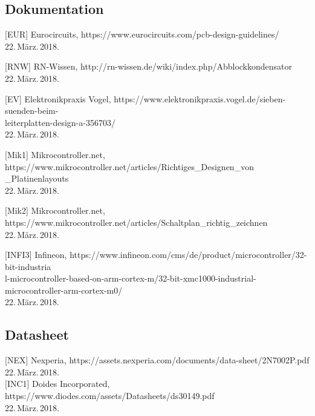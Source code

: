 \subsection{Dokumentation}

{ {[EUR] {Eurocircuits}}, {https://www.eurocircuits.com/pcb-design-guidelines/ }
\\ {22.\,März.\,2018}.\\

{ {[RNW] {RN-Wissen}}, {http://rn-wissen.de/wiki/index.php/Abblockkondensator }
\\ {22.\,März.\,2018}.\\

{ {[EV] {Elektronikpraxis Vogel}}, {https://www.elektronikpraxis.vogel.de/sieben-suenden-beim-\\leiterplatten-design-a-356703/ }
\\ {22.\,März.\,2018}.\\

{ {[Mik1] {Mikrocontroller.net}}, { https://www.mikrocontroller.net/articles/Richtiges\_Designen\_von\\
\_Platinenlayouts }
\\ {22.\,März.\,2018}.\\

{ {[Mik2] {Mikrocontroller.net}}, {https://www.mikrocontroller.net/articles/Schaltplan\_richtig\_zeichnen }
\\ {22.\,März.\,2018}.\\

{ {[INFI3] {Infineon}}, {https://www.infineon.com/cms/de/product/microcontroller/32-bit-industria\\
l-microcontroller-based-on-arm-cortex-m/32-bit-xmc1000-industrial-microcontroller-arm-cortex-m0/   }
\\ {22.\,März.\,2018}.\\

\subsection{Datasheet}

{ {[NEX] {Nexperia}}, {https://assets.nexperia.com/documents/data-sheet/2N7002P.pdf}
\\ {22.\,März.\,2018}.\\

{{[INC1] {Doides Incorporated}}, {https://www.diodes.com/assets/Datasheets/ds30149.pdf}
\\{22.\,März.\,2018}.\\

}}}}}}}}
